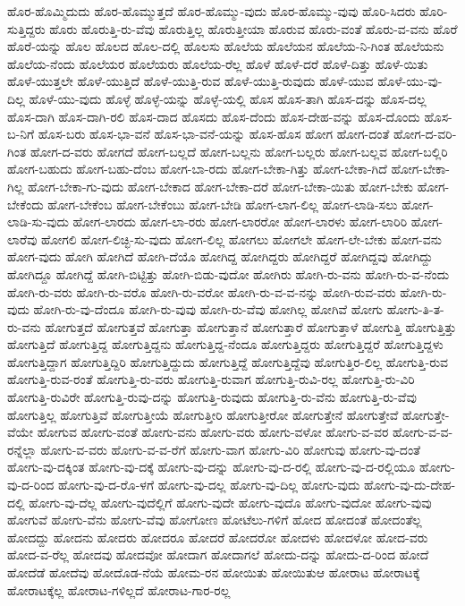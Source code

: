 {ಹೊರ-ಹೊಮ್ಮಿದುದು
ಹೊರ-ಹೊಮ್ಮುತ್ತದೆ
ಹೊರ-ಹೊಮ್ಮು-ವುದು
ಹೊರ-ಹೊಮ್ಮು-ವುವು
ಹೊರಿ-ಸಿದರು
ಹೊರಿ-ಸುತ್ತಿದ್ದರು
ಹೊರು
ಹೊರುತ್ತಿ-ರು-ವೆವು
ಹೊರುತ್ತಿಲ್ಲ
ಹೊರುತ್ತೀಯಾ
ಹೊರುವ
ಹೊರು-ವಂತೆ
ಹೊರು-ವ-ವನು
ಹೊರೆ
ಹೊರೆ-ಯನ್ನು
ಹೊಲ
ಹೊಲದ
ಹೊಲ-ದಲ್ಲಿ
ಹೊಲಸು
ಹೊಲೆಯ
ಹೊಲೆಯನ
ಹೊಲೆಯ-ನಿ-ಗಿಂತ
ಹೊಲೆಯನು
ಹೊಲೆಯ-ನೆಂದು
ಹೊಲೆಯರ
ಹೊಲೆಯರು
ಹೊಲೆಯ-ರೆಲ್ಲ
ಹೊಳೆ
ಹೊಳೆ-ದರೆ
ಹೊಳೆ-ದಿತ್ತು
ಹೊಳೆ-ಯಿತು
ಹೊಳೆ-ಯುತ್ತಲೇ
ಹೊಳೆ-ಯುತ್ತಿದೆ
ಹೊಳೆ-ಯುತ್ತಿ-ರುವ
ಹೊಳೆ-ಯುತ್ತಿ-ರುವುದು
ಹೊಳೆ-ಯುವ
ಹೊಳೆ-ಯು-ವು-ದಿಲ್ಲ
ಹೊಳೆ-ಯು-ವುದು
ಹೊಳ್ಳೆ
ಹೊಳ್ಳೆ-ಯನ್ನು
ಹೊಳ್ಳೆ-ಯಲ್ಲಿ
ಹೊಸ
ಹೊಸ-ತಾಗಿ
ಹೊಸ-ದನ್ನು
ಹೊಸ-ದಲ್ಲ
ಹೊಸ-ದಾಗಿ
ಹೊಸ-ದಾಗಿ-ರಲಿ
ಹೊಸ-ದಾದ
ಹೊಸದು
ಹೊಸ-ದೆಂದು
ಹೊಸ-ದೇಹ-ವನ್ನು
ಹೊಸ-ದೊಂದು
ಹೊಸ-ಬ-ನಿಗೆ
ಹೊಸ-ಬರು
ಹೊಸ-ಭಾ-ವನೆ
ಹೊಸ-ಭಾ-ವನೆ-ಯನ್ನು
ಹೊಸ-ಹೊಸ
ಹೋಗ
ಹೋಗ-ದಂತೆ
ಹೋಗ-ದ-ವರಿ-ಗಿಂತ
ಹೋಗ-ದ-ವರು
ಹೋಗದೆ
ಹೋಗ-ಬಲ್ಲದೆ
ಹೋಗ-ಬಲ್ಲನು
ಹೋಗ-ಬಲ್ಲರು
ಹೋಗ-ಬಲ್ಲವ
ಹೋಗ-ಬಲ್ಲಿರಿ
ಹೋಗ-ಬಹುದು
ಹೋಗ-ಬಹು-ದೆಂಬ
ಹೋಗ-ಬಾ-ರದು
ಹೋಗ-ಬೇಕಾ-ಗಿತ್ತು
ಹೋಗ-ಬೇಕಾ-ಗಿದೆ
ಹೋಗ-ಬೇಕಾ-ಗಿಲ್ಲ
ಹೋಗ-ಬೇಕಾ-ಗು-ವುದು
ಹೋಗ-ಬೇಕಾದ
ಹೋಗ-ಬೇಕಾ-ದರೆ
ಹೋಗ-ಬೇಕಾ-ಯಿತು
ಹೋಗ-ಬೇಕು
ಹೋಗ-ಬೇಕೆಂದು
ಹೋಗ-ಬೇಕೆಂಬ
ಹೋಗ-ಬೇಕೆಂಬು
ಹೋಗ-ಬೇಡಿ
ಹೋಗ-ಲಾಗ-ಲಿಲ್ಲ
ಹೋಗ-ಲಾಡಿ-ಸಲು
ಹೋಗ-ಲಾಡಿ-ಸು-ವುದು
ಹೋಗ-ಲಾರದು
ಹೋಗ-ಲಾ-ರರು
ಹೋಗ-ಲಾರರೋ
ಹೋಗ-ಲಾರಳು
ಹೋಗ-ಲಾರಿರಿ
ಹೋಗ-ಲಾರೆವು
ಹೋಗಲಿ
ಹೋಗ-ಲಿಚ್ಛಿ-ಸು-ವುದು
ಹೋಗ-ಲಿಲ್ಲ
ಹೋಗಲು
ಹೋಗಲೇ
ಹೋಗ-ಲೇ-ಬೇಕು
ಹೋಗ-ವನು
ಹೋಗ-ವುದು
ಹೋಗಿ
ಹೋಗಿದೆ
ಹೋಗಿ-ದೆಯೊ
ಹೋಗಿದ್ದ
ಹೋಗಿದ್ದರು
ಹೋಗಿದ್ದರೆ
ಹೋಗಿದ್ದವು
ಹೋಗಿದ್ದು
ಹೋಗಿದ್ದೂ
ಹೋಗಿದ್ದೆ
ಹೋಗಿ-ಬಿಟ್ಟಿತ್ತು
ಹೋಗಿ-ಬಿಡು-ವುದೋ
ಹೋಗಿರು
ಹೋಗಿ-ರು-ವನು
ಹೋಗಿ-ರು-ವ-ನೆಂದು
ಹೋಗಿ-ರು-ವರು
ಹೋಗಿ-ರು-ವರೊ
ಹೋಗಿ-ರು-ವರೋ
ಹೋಗಿ-ರು-ವ-ವ-ನನ್ನು
ಹೋಗಿ-ರುವ-ವರು
ಹೋಗಿ-ರು-ವುದು
ಹೋಗಿ-ರು-ವು-ದೆಂದೂ
ಹೋಗಿ-ರು-ವುವು
ಹೋಗಿ-ರು-ವೆವು
ಹೋಗಿಲ್ಲ
ಹೋಗಿವೆ
ಹೋಗು
ಹೋಗು-ತಿ-ತ-ರು-ವನು
ಹೋಗುತ್ತದೆ
ಹೋಗುತ್ತವೆ
ಹೋಗುತ್ತಾ
ಹೋಗುತ್ತಾನೆ
ಹೋಗುತ್ತಾರೆ
ಹೋಗುತ್ತಾಳೆ
ಹೋಗುತ್ತಿ
ಹೋಗುತ್ತಿತ್ತು
ಹೋಗುತ್ತಿದೆ
ಹೋಗುತ್ತಿದ್ದ
ಹೋಗುತ್ತಿದ್ದನು
ಹೋಗುತ್ತಿದ್ದ-ನೆಂದೂ
ಹೋಗುತ್ತಿದ್ದರು
ಹೋಗುತ್ತಿದ್ದರೆ
ಹೋಗುತ್ತಿದ್ದಳು
ಹೋಗುತ್ತಿದ್ದಾಗ
ಹೋಗುತ್ತಿದ್ದಿರಿ
ಹೋಗುತ್ತಿದ್ದುದು
ಹೋಗುತ್ತಿದ್ದೆ
ಹೋಗುತ್ತಿದ್ದೆವು
ಹೋಗುತ್ತಿರ-ಲಿಲ್ಲ
ಹೋಗುತ್ತಿ-ರುವ
ಹೋಗುತ್ತಿ-ರುವ-ರಂತೆ
ಹೋಗುತ್ತಿ-ರು-ವರು
ಹೋಗುತ್ತಿ-ರುವಾಗ
ಹೋಗುತ್ತಿ-ರುವಿ-ರಲ್ಲ
ಹೋಗುತ್ತಿ-ರು-ವಿರಿ
ಹೋಗುತ್ತಿ-ರುವಿರೇ
ಹೋಗುತ್ತಿ-ರುವು-ದನ್ನು
ಹೋಗುತ್ತಿ-ರುವುದು
ಹೋಗುತ್ತಿ-ರು-ವೆನು
ಹೋಗುತ್ತಿ-ರು-ವೆವು
ಹೋಗುತ್ತಿಲ್ಲ
ಹೋಗುತ್ತಿವೆ
ಹೋಗುತ್ತೀಯೆ
ಹೋಗುತ್ತೀರಿ
ಹೋಗುತ್ತೀರೋ
ಹೋಗುತ್ತೇನೆ
ಹೋಗುತ್ತೇವೆ
ಹೋಗುತ್ತೇ-ವೆಯೇ
ಹೋಗುವ
ಹೋಗು-ವಂತೆ
ಹೋಗು-ವನು
ಹೋಗು-ವರು
ಹೋಗು-ವಳೋ
ಹೋಗು-ವ-ವರ
ಹೋಗು-ವ-ವ-ರನ್ನೆಲ್ಲಾ
ಹೋಗು-ವ-ವರು
ಹೋಗು-ವ-ವ-ರೆಗೆ
ಹೋಗು-ವಾಗ
ಹೋಗು-ವಿರಿ
ಹೋಗುವು
ಹೋಗು-ವು-ದಂತೆ
ಹೋಗು-ವು-ದಕ್ಕಿಂತ
ಹೋಗು-ವು-ದಕ್ಕೆ
ಹೋಗು-ವು-ದನ್ನು
ಹೋಗು-ವು-ದ-ರಲ್ಲಿ
ಹೋಗು-ವು-ದ-ರಲ್ಲಿಯೂ
ಹೋಗು-ವು-ದ-ರಿಂದ
ಹೋಗು-ವು-ದ-ರೊ-ಳಗೆ
ಹೋಗು-ವು-ದಲ್ಲ
ಹೋಗು-ವು-ದಿಲ್ಲ
ಹೋಗು-ವುದು
ಹೋಗು-ವು-ದು-ದೇಹ-ದಲ್ಲಿ
ಹೋಗು-ವು-ದೆಲ್ಲ
ಹೋಗು-ವುದೆಲ್ಲಿಗೆ
ಹೋಗು-ವುದೇ
ಹೋಗು-ವುದೊ
ಹೋಗು-ವುದೋ
ಹೋಗು-ವುವು
ಹೋಗುವೆ
ಹೋಗು-ವೆನು
ಹೋಗು-ವೆವು
ಹೋಗೋಣ
ಹೋಟೆಲು-ಗಳಿಗೆ
ಹೋದ
ಹೋದಂತೆ
ಹೋದಂತೆಲ್ಲ
ಹೋದದ್ದು
ಹೋದನು
ಹೋದರು
ಹೋದರೂ
ಹೋದರೆ
ಹೋದರೋ
ಹೋದಳು
ಹೋದಳೋ
ಹೋದ-ವರು
ಹೋದ-ವ-ರೆಲ್ಲ
ಹೋದವು
ಹೋದವೋ
ಹೋದಾಗ
ಹೋದಾಗಲೆ
ಹೋದು-ದನ್ನು
ಹೋದು-ದ-ರಿಂದ
ಹೋದೆ
ಹೋದೆಡೆ
ಹೋದೆವು
ಹೋದೊಡ-ನೆಯೆ
ಹೋಮ-ರನ
ಹೋಯಿತು
ಹೋಯಿತುಆ
ಹೋರಾಟ
ಹೋರಾಟಕ್ಕೆ
ಹೋರಾಟಕ್ಕೆಲ್ಲ
ಹೋರಾಟ-ಗಳಿಲ್ಲದೆ
ಹೋರಾಟ-ಗಾರ-ರಲ್ಲ
}
